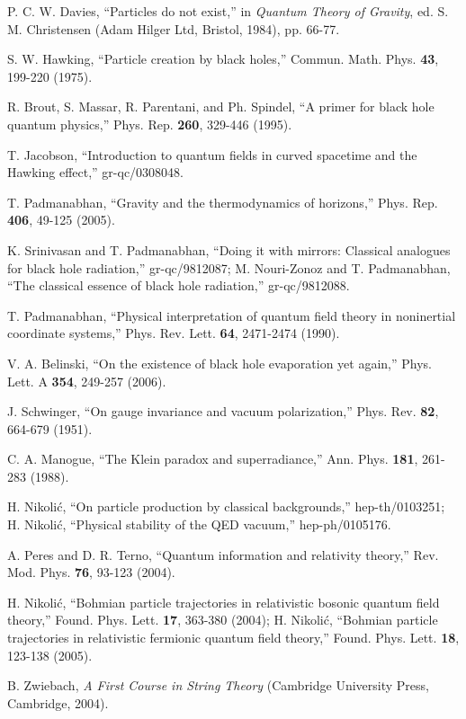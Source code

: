 \documentclass[12pt]{article}
\begin{document}
\begin{thebibliography}{99}
P. C. W. Davies, 
``Particles do not exist,''
in {\it Quantum Theory of Gravity}, ed. S. M. Christensen
(Adam Hilger Ltd, Bristol, 1984), pp. 66-77.

S. W. Hawking,
``Particle creation by black holes,''
Commun. Math. Phys. {\bf 43}, 199-220 (1975).

R. Brout, S. Massar, R. Parentani, and Ph. Spindel,
``A primer for black hole quantum physics,''
Phys. Rep. {\bf 260}, 329-446 (1995).

T. Jacobson,
``Introduction to quantum fields in curved spacetime and the Hawking
effect,''
gr-qc/0308048.

T. Padmanabhan,
``Gravity and the thermodynamics of horizons,''
Phys. Rep. {\bf 406}, 49-125 (2005).

K. Srinivasan and T. Padmanabhan,
``Doing it with mirrors: Classical analogues for black hole radiation,''
gr-qc/9812087;
M. Nouri-Zonoz and T. Padmanabhan, 
``The classical essence of black hole radiation,''
gr-qc/9812088.

T. Padmanabhan,
``Physical interpretation of quantum field theory in 
noninertial coordinate systems,''
Phys. Rev. Lett. {\bf 64}, 2471-2474 (1990).

V. A. Belinski, 
``On the existence of black hole evaporation yet again,''
Phys. Lett. A {\bf 354}, 249-257 (2006).

J. Schwinger,
``On gauge invariance and vacuum polarization,''
Phys. Rev. {\bf 82}, 664-679 (1951).

C. A. Manogue,
``The Klein paradox and superradiance,''
Ann. Phys. {\bf 181}, 261-283 (1988).

H. Nikoli\'c,
``On particle production by classical backgrounds,''
hep-th/0103251;
H. Nikoli\'c,
``Physical stability of the QED vacuum,''
hep-ph/0105176.

A. Peres and D. R. Terno,
``Quantum information and relativity theory,''
Rev. Mod. Phys. {\bf 76}, 93-123 (2004).

H. Nikoli\'c,
``Bohmian particle trajectories in relativistic bosonic quantum field
theory,''
Found. Phys. Lett. {\bf 17}, 363-380 (2004);
H. Nikoli\'c,
``Bohmian particle trajectories in relativistic fermionic quantum field
theory,''
Found. Phys. Lett. {\bf 18}, 123-138 (2005).

B. Zwiebach, {\it A First Course in String Theory}
(Cambridge University Press, Cambridge, 2004).


\end{thebibliography}
\end{document}
